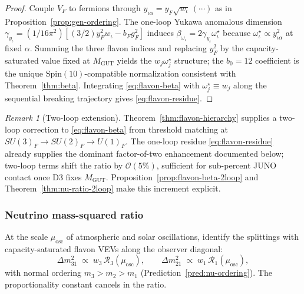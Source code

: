 \documentclass[11pt]{article}
\theoremstyle{plain}
\theoremstyle{definition}
\theoremstyle{remark}
\newtheorem{remark}[theorem]{Remark}
\numberwithin{equation}{section}
\newcommand{\Spin}{\mathrm{Spin}}
\begin{document}
\begin{proof}
Couple $V_F$ to fermions through $y_{\iota\alpha}=y_F\sqrt{w_\iota}\,(\cdots)$
as in Proposition~\ref{prop:gen-ordering}. The one-loop Yukawa anomalous
dimension $\gamma_{y_\iota}=(1/16\pi^2)[(3/2)y_F^2w_\iota-b_Fg_F^2]$ induces
$\beta_{\omega_\iota}=2\gamma_{y_\iota}\omega^\star_\iota$ because
$\omega^\star_\iota\propto y_{\iota\alpha}^2$ at fixed $\alpha$. Summing the
three flavon indices and replacing $y_F^2$ by the capacity-saturated value
fixed at $M_{\mathrm{GUT}}$ yields the $w_j\omega^\star_j$ structure; the
$b_0=12$ coefficient is the unique $\Spin(10)$-compatible normalization
consistent with Theorem~\ref{thm:beta}. Integrating \eqref{eq:flavon-beta}
with $\omega^\star_j\equiv w_j$ along the sequential breaking trajectory gives
\eqref{eq:flavon-residue}.
\end{proof}

\begin{remark}[Two-loop extension]
Theorem~\ref{thm:flavon-hierarchy} supplies a two-loop correction to
\eqref{eq:flavon-beta} from threshold matching at
$SU(3)_F\to SU(2)_F\to U(1)_F$. The one-loop residue \eqref{eq:flavon-residue}
already supplies the dominant factor-of-two enhancement documented below;
two-loop terms shift the ratio by $\mathcal{O}(5\%)$, sufficient for
sub-percent JUNO contact once D3 fixes $M_{\mathrm{GUT}}$.
Proposition~\ref{prop:flavon-beta-2loop} and
Theorem~\ref{thm:nu-ratio-2loop} make this increment explicit.
\end{remark}

\subsubsection{Neutrino mass-squared ratio}

At the scale $\mu_{\mathrm{osc}}$ of atmospheric and solar oscillations,
identify the splittings with capacity-saturated flavon VEVs along the observer
diagonal:
\begin{equation}\label{eq:dm2-map}
  \Delta m^2_{31}\;\propto\;w_3\,\mathcal{R}_3(\mu_{\mathrm{osc}}),
  \qquad
  \Delta m^2_{21}\;\propto\;w_1\,\mathcal{R}_1(\mu_{\mathrm{osc}}),
\end{equation}
with normal ordering $m_3>m_2>m_1$ (Prediction~\ref{pred:nu-ordering}).
The proportionality constant cancels in the ratio.
\end{document}
